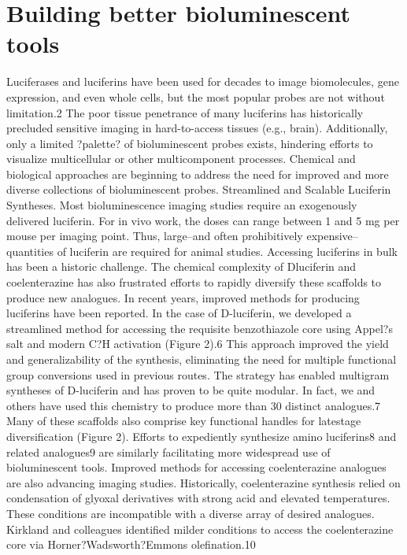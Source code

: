 \section{Building better bioluminescent tools}
Luciferases and luciferins have been used for decades to image
biomolecules, gene expression, and even whole cells, but the
most popular probes are not without limitation.2 The poor
tissue penetrance of many luciferins has historically precluded
sensitive imaging in hard-to-access tissues (e.g., brain).
Additionally, only a limited ?palette? of bioluminescent probes
exists, hindering efforts to visualize multicellular or other
multicomponent processes. Chemical and biological approaches
are beginning to address the need for improved and
more diverse collections of bioluminescent probes.
Streamlined and Scalable Luciferin Syntheses. Most
bioluminescence imaging studies require an exogenously
delivered luciferin. For in vivo work, the doses can range
between 1 and 5 mg per mouse per imaging point. Thus,
large--and often prohibitively expensive--quantities of luciferin
are required for animal studies. Accessing luciferins in bulk
has been a historic challenge. The chemical complexity of Dluciferin
and coelenterazine has also frustrated efforts to rapidly
diversify these scaffolds to produce new analogues.
In recent years, improved methods for producing luciferins
have been reported. In the case of D-luciferin, we developed a
streamlined method for accessing the requisite benzothiazole
core using Appel?s salt and modern C?H activation (Figure
2).6 This approach improved the yield and generalizability of
the synthesis, eliminating the need for multiple functional
group conversions used in previous routes. The strategy has
enabled multigram syntheses of D-luciferin and has proven to
be quite modular. In fact, we and others have used this
chemistry to produce more than 30 distinct analogues.7 Many
of these scaffolds also comprise key functional handles for latestage
diversification (Figure 2). Efforts to expediently
synthesize amino luciferins8 and related analogues9 are similarly
facilitating more widespread use of bioluminescent tools.
Improved methods for accessing coelenterazine analogues
are also advancing imaging studies. Historically, coelenterazine
synthesis relied on condensation of glyoxal derivatives with
strong acid and elevated temperatures. These conditions are
incompatible with a diverse array of desired analogues. Kirkland
and colleagues identified milder conditions to access the
coelenterazine core via Horner?Wadsworth?Emmons olefination.10
